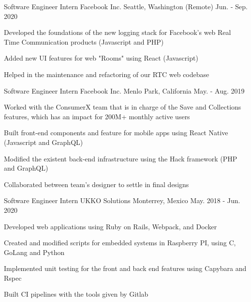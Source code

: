 \begin{cventries}
  \cventry
    {Software Engineer Intern} %
    {Facebook Inc.} %
    {Seattle, Washington (Remote)} %
    {Jun. - Sep. 2020} %
    {
      \begin{cvitems} %
        \item {Developed the foundations of the new logging stack for Facebook's web Real Time Communication products (Javascript and PHP)}
        \item {Added new UI features for web "Rooms" using React (Javascript)}
        \item {Helped in the maintenance and refactoring of our RTC web codebase}
        \item {}
      \end{cvitems}
    }
  \cventry
    {Software Engineer Intern} %
    {Facebook Inc.} %
    {Menlo Park, California} %
    {May. - Aug. 2019} %
    {
      \begin{cvitems} %
        \item {Worked with the ConsumerX team that is in charge of the Save and Collections features, which has an impact for 200M+ monthly active users}
        \item {Built front-end components and feature for mobile apps using React Native (Javascript and GraphQL)}
        \item {Modified the existent back-end infrastructure using the Hack framework (PHP and GraphQL)}
        \item {Collaborated between team's designer to settle in final designs}
      \end{cvitems}
    }
  \cventry
    {Software Engineer Intern} %
    {UKKO Solutions} %
    {Monterrey, Mexico} %
    {May. 2018 - Jun. 2020} %
    {
      \begin{cvitems} %
        \item {Developed web applications using Ruby on Rails, Webpack, and Docker}
        \item {Created and modified scripts for embedded systems in Raspberry PI, using C, GoLang and Python}
        \item {Implemented unit testing for the front and back end features using Capybara and Rspec}
        \item {Built CI pipelines with the tools given by Gitlab}
      \end{cvitems}
    }
\end{cventries}
